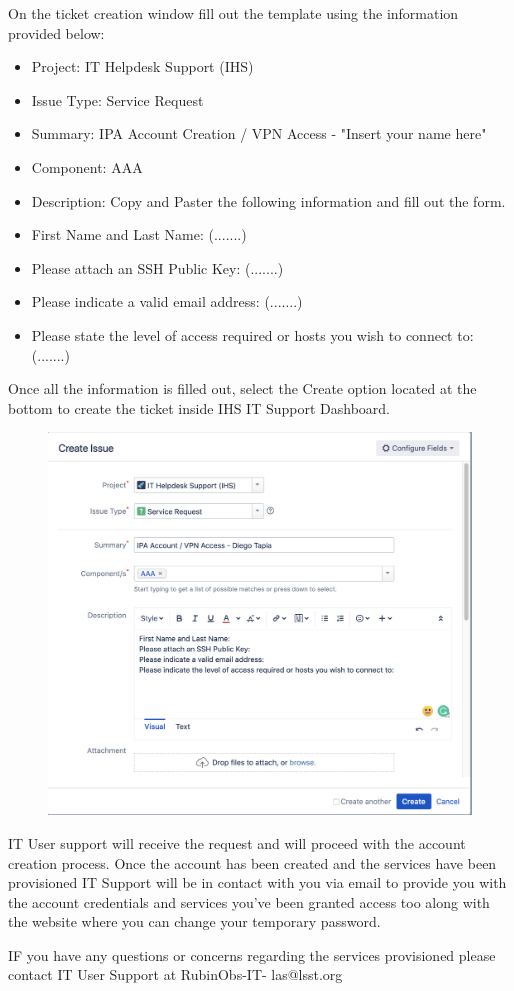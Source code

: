 On the ticket creation window fill out the template using the information provided below:

\begin{itemize}
  \item Project: IT Helpdesk Support (IHS)
  \item Issue Type: Service Request
  \item Summary: IPA Account Creation / VPN Access - "Insert your name here"
  \item Component: AAA
  \item Description: Copy and Paster the following information and fill out the form.
\end{itemize}

\begin{itemize}
  \item First Name and Last Name: (.......)
  \item Please attach an SSH Public Key: (.......)
  \item Please indicate a valid email address: (.......)
  \item Please state the level of access required or hosts you wish to connect to: (.......)
\end{itemize}

Once all the information is filled out, select the Create option located at the bottom to create the ticket inside IHS IT Support Dashboard.

\begin{figure}
  \includegraphics[width=15cm]{Images/example3.png}
  \centering
\end{figure}

IT User support will receive the request and will proceed with the account creation process. Once the account has been created and the services have been provisioned IT Support will be in contact with you via email to provide you with the account credentials and services you've been granted access too along with the website where you can change your temporary password.


IF you have any questions or concerns regarding the services provisioned please contact IT User Support at RubinObs-IT- las@lsst.org
